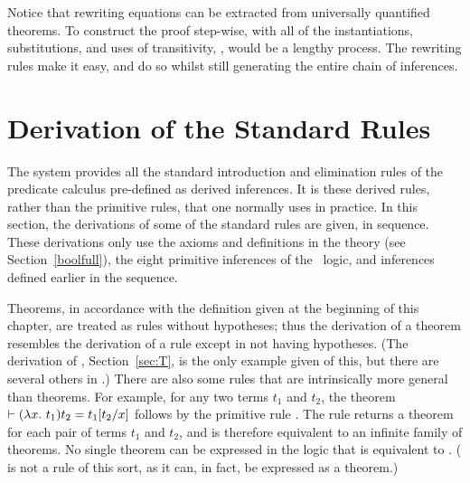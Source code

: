 \noindent Notice that rewriting
equations can be extracted from
universally quantified theorems.
To construct the
proof step-wise, with all of the instantiations,
substitutions, and uses of transitivity, \etc,
would be a lengthy process. The rewriting rules make it easy,
and do so whilst still generating the entire chain of inferences.

\section{Derivation of the Standard Rules}
\label{sec:standard-rule-derivation}

%
The \HOL{} system provides all the standard introduction and
elimination rules of the predicate calculus pre-defined as derived
inferences.  It is these derived rules, rather than the primitive
rules, that one normally uses in practice.  In this section, the
derivations of some of the standard rules are given, in sequence.
These derivations only use the axioms and definitions in the theory
 (see Section~\ref{boolfull}), the eight primitive
inferences of the \HOL\ logic, and inferences defined earlier in the
sequence.

Theorems,%
%
%
%
in accordance with the definition given at the beginning of this
chapter, are treated as rules without hypotheses; thus the derivation
of a theorem resembles the derivation of a rule except in not having
hypotheses. (The derivation of , Section~\ref{sec:T}, is
the only example given of this, but there are several others in \HOL.)
There are also some rules that are intrinsically more general than
theorems.  For example, for any two terms $t_1$ and $t_2$, the theorem
$\vdash(\lambda x.\ t_1)t_2 = t_1[t_2/x]$ follows by the primitive rule
. The rule  returns a theorem for each
pair of terms $t_1$ and $t_2$, and is therefore equivalent to an
infinite family%
%
%
%
of theorems. No single theorem can be expressed in the \HOL{} logic
that is equivalent to .%
%
%
( is not a rule of this sort, as it can, in fact, be
expressed as a theorem.)

